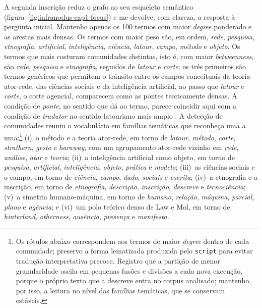 A segunda inscrição reduz o grafo ao seu esqueleto semântico (figura~\ref{fig:infranodus-cap1-focus}) e me devolve, com clareza, a resposta à pergunta inicial. Mantenho apenas os 100 termos com maior \textit{degree} ponderado e as arestas mais densas. Os termos com maior peso são, em ordem, \textit{rede}, \textit{pesquisa}, \textit{etnografia}, \textit{artificial}, \textit{inteligência}, \textit{ciência}, \textit{latour}, \textit{campo}, \textit{método} e \textit{objeto}. Os termos que mais costuram comunidades distintas, isto é, com maior \textit{betweenness}, são \textit{rede}, \textit{pesquisa} e \textit{etnografia}, seguidos de \textit{latour} e \textit{corte}: os três primeiros são termos genéricos que permitem o trânsito entre os campos conceituais da teoria ator-rede, das ciências sociais e da inteligência artificial, ao passo que \textit{latour} e \textit{corte}, o corte agencial, comparecem como as pontes teoricamente densas. A condição de \textit{ponte}, no sentido que \textcite{Latour1986Visualization} dá ao termo, parece coincidir aqui com a condição de \textit{tradutor} no sentido latouriano mais amplo \parencite{Latour2011CienciaEmAcao}. A detecção de comunidades reuniu o vocabulário em famílias temáticas que reconheço uma a uma:\footnote{Os rótulos abaixo correspondem aos termos de maior \textit{degree} dentro de cada comunidade; preservo a forma lematizada produzida pelo \texttt{script} para evitar tradução interpretativa precoce. Registro que a partição de menor granularidade oscila em pequenas fusões e divisões a cada nova execução, porque o próprio texto que a descreve entra no corpus analisado; mantenho, por isso, a leitura no nível das famílias temáticas, que se conservam estáveis.} (i)~o método e a teoria ator-rede, em torno de \textit{latour}, \textit{método}, \textit{corte}, \textit{strathern}, \textit{gesto} e \textit{haraway}, com um agrupamento ator-rede vizinho em \textit{rede}, \textit{análise}, \textit{ator} e \textit{teoria}; (ii)~a inteligência artificial como objeto, em torno de \textit{pesquisa}, \textit{artificial}, \textit{inteligência}, \textit{objeto}, \textit{prática} e \textit{modelo}; (iii)~as ciências sociais e o campo, em torno de \textit{ciência}, \textit{campo}, \textit{dado}, \textit{sociais} e \textit{escrita}; (iv)~a etnografia e a inscrição, em torno de \textit{etnografia}, \textit{descrição}, \textit{inscrição}, \textit{descreve} e \textit{tecnociência}; (v)~a simetria humano-máquina, em torno de \textit{humano}, \textit{relação}, \textit{máquina}, \textit{parcial}, \textit{plano} e \textit{agência}; e (vi)~um polo teórico denso de Law e Mol, em torno de \textit{hinterland}, \textit{otherness}, \textit{ausência}, \textit{presença} e \textit{manifesta}.

